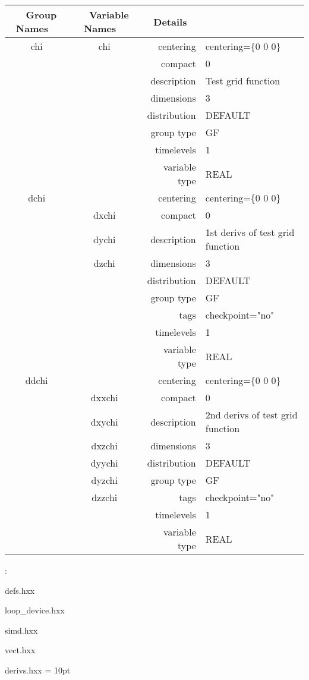\begin{tabular*}{150mm}{|c|c@{\extracolsep{\fill}}|rl|} \hline 
~ {\bf Group Names} ~ & ~ {\bf Variable Names} ~  &{\bf Details} ~ & ~\\ 
\hline 
chi & chi & centering & centering=\{0 0 0\} \\ 
 &  & compact & 0 \\ 
 &  & description & Test grid function \\ 
 &  & dimensions & 3 \\ 
 &  & distribution & DEFAULT \\ 
 &  & group type & GF \\ 
 &  & timelevels & 1 \\ 
 &  & variable type & REAL \\ 
\hline 
dchi &  & centering & centering=\{0 0 0\} \\ 
 & dxchi & compact & 0 \\ 
 & dychi & description & 1st derivs of test grid function \\ 
 & dzchi & dimensions & 3 \\ 
 &  & distribution & DEFAULT \\ 
 &  & group type & GF \\ 
 &  & tags & checkpoint="no" \\ 
 &  & timelevels & 1 \\ 
 &  & variable type & REAL \\ 
\hline 
ddchi &  & centering & centering=\{0 0 0\} \\ 
 & dxxchi & compact & 0 \\ 
 & dxychi & description & 2nd derivs of test grid function \\ 
 & dxzchi & dimensions & 3 \\ 
 & dyychi & distribution & DEFAULT \\ 
 & dyzchi & group type & GF \\ 
 & dzzchi & tags & checkpoint="no" \\ 
 &  & timelevels & 1 \\ 
 &  & variable type & REAL \\ 
\hline 
\end{tabular*} 



\vspace{5mm}

: 

defs.hxx

loop\_device.hxx

simd.hxx

vect.hxx

derivs.hxx
\vspace{2mm}\parskip = 10pt 
